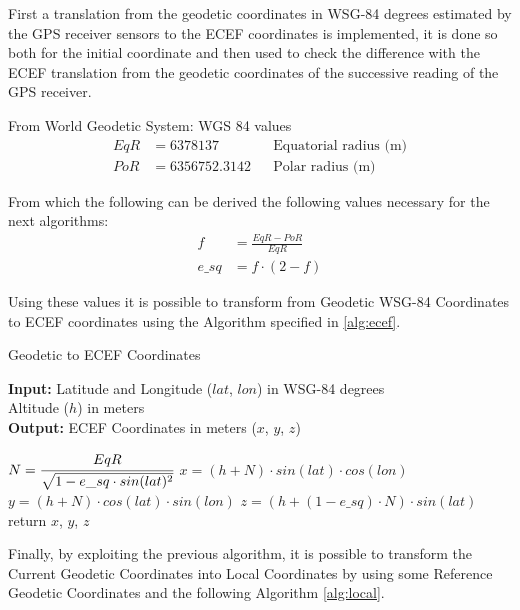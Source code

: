 First a translation from the geodetic coordinates in WSG-84 degrees estimated by the GPS receiver sensors to the ECEF coordinates is implemented, it is done so both for the initial coordinate and then used to check the difference with the ECEF translation from the geodetic coordinates of the successive reading of the GPS receiver.


    
From World Geodetic System: WGS 84 values 
\begin{align}
    EqR &= 6378137 && \text{Equatorial radius (m)} \\
    PoR &= 6356752.3142 && \text{Polar radius (m)} 
\end{align}

From which the following can be derived the following values necessary for the next algorithms:
\begin{align}
    f &= \frac{EqR - PoR}{EqR} \\
    e\_sq &= f \cdot (2-f) 
\end{align}

Using these values it is possible to transform from Geodetic WSG-84 Coordinates to ECEF coordinates using the  Algorithm specified in \ref{alg:ecef}.


\begin{algorithm}[H]
\caption{Geodetic to ECEF Coordinates }
\label{alg:ecef}
  \hspace*{\algorithmicindent} \textbf{Input:} Latitude and Longitude ($lat$, $lon$) in WSG-84 degrees\\
  \hspace*{4em} Altitude ($h$) in meters\\
  \hspace*{\algorithmicindent} \textbf{Output:} ECEF Coordinates in meters ($x$, $y$, $z$)
  \begin{algorithmic}[1]
  \STATE $N = \cfrac{EqR}{\sqrt{1 - e\_sq \cdot sin(lat)^2}}$
  \STATE $x = (h + N) \cdot sin(lat) \cdot cos(lon)$
  \STATE $y = (h + N) \cdot cos(lat) \cdot sin(lon)$
  \STATE $z = (h + (1 - e\_sq) \cdot N) \cdot sin(lat)$
  \STATE return $x$, $y$, $z$
    \end{algorithmic}
\end{algorithm}

Finally, by exploiting the previous algorithm, it is possible to transform the Current Geodetic Coordinates into Local Coordinates by using some Reference Geodetic Coordinates and the following Algorithm \ref{alg:local}. 

